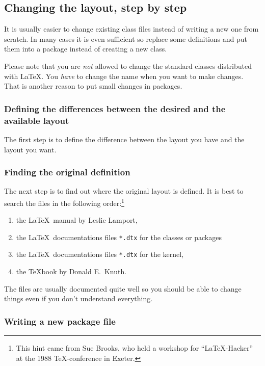 \documentclass[twoside,a4paper]{refart}
\begin{document}
\subsection{Changing the layout, step by step}

It is usually easier to change existing class files instead of 
writing a new one from scratch. In many cases it is even sufficient 
so replace some definitions and put them into a package instead of 
creating a new class.

Please note that you are \emph{not} allowed to change the standard 
classes distributed with \LaTeX. You \emph{have} to change the name 
when you want to make changes. That is another reason to put small 
changes in packages.

\subsubsection{Defining the differences between the desired  and 
the available layout}

The first step is to define the difference between the layout you have 
and the layout you want. 

\subsubsection{Finding the original definition}

The next step is to find out where the original layout is defined.  It 
is best to search the files in the following order:\footnote{This hint 
came from Sue Brooks, who held a workshop for ``\LaTeX-Hacker'' at the 
1988 \TeX-conference in Exeter.}
\begin{enumerate}
\item the \LaTeX\ manual by Leslie Lamport,
\item the \LaTeX\ documentations files \texttt{*.dtx} for the classes 
or packages
\item the \LaTeX\ documentations files \texttt{*.dtx} for the kernel,
\item the \TeX book by Donald E.~Knuth.
\end{enumerate}

The files are usually documented quite well so you should be able to 
change things even if you don't understand everything.


\subsubsection{Writing a new package file}
\end{document}
